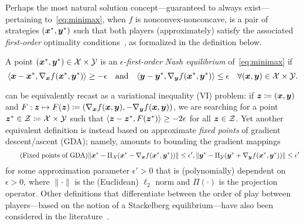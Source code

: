 Perhaps the most natural solution concept---guaranteed to always exist---pertaining to~\eqref{eq:minimax}, when $f$ is nonconvex-nonconcave, is a pair of strategies $({\bm{x}}^*, {\bm{y}}^*)$ such that both players (approximately) satisfy the associated \emph{first-order} optimality conditions~\citep{Tsaknakis21:Finding,Jordan23:First,Ostrovskii21:Efficient,Nouiehed19:Solving}, as formalized in the definition below.
\begin{definition}
    \label{def:FONE}
    A point $({\bm{x}}^*, {\bm{y}}^*) \in \mathcal{X} \times \mathcal{Y}$ is an \emph{$\epsilon$-first-order Nash equilibrium} of~\eqref{eq:minimax} if
    \begin{equation*}
        \langle {\bm{x}} - {\bm{x}}^*, \nabla_{{\bm{x}}} f({\bm{x}}^*, {\bm{y}}^*) \rangle \geq -\epsilon \quad \text{and} \quad \langle {\bm{y}} - {\bm{y}}^*, \nabla_{{\bm{y}}} f({\bm{x}}^*, {\bm{y}}^*) \rangle \leq  \epsilon \quad \forall ({\bm{x}}, {\bm{y}}) \in \mathcal{X} \times \mathcal{Y}.
    \end{equation*}
\end{definition}
 can be equivalently recast as a variational inequality (VI) problem: if ${\bm{z}} \coloneqq ({\bm{x}}, {\bm{y}})$ and $F : {\bm{z}} \mapsto F({\bm{z}}) \coloneqq (\nabla_{{\bm{x}}} f({\bm{x}}, {\bm{y}}), -\nabla_{{\bm{y}}} f({\bm{x}}, {\bm{y}}))$, we are searching for a point ${\bm{z}}^* \in \mathcal{Z} \coloneqq \mathcal{X} \times \mathcal{Y}$ such that $\langle {\bm{z}} - {\bm{z}}^*, F({\bm{z}}^*) \rangle \geq - 2 \epsilon$ for all ${\bm{z}} \in \mathcal{Z}$. Yet another equivalent definition is instead based on approximate \emph{fixed points} of gradient descent/ascent (GDA); namely,  amounts to bounding the gradient mappings
\begin{equation}
\label{eq:fpgda}
\tag{Fixed points of GDA} 
\| {\bm{x}}^* - \Pi_{\mathcal{X}} ( {\bm{x}}^* - \nabla_{{\bm{x}}} f({\bm{x}}^*, {\bm{y}}^*) ) \|\leq \epsilon', \| {\bm{y}}^* - \Pi_{\mathcal{Y}} ( {\bm{y}}^* + \nabla_{{\bm{y}}} f({\bm{x}}^*, {\bm{y}}^*) ) \|  \leq \epsilon'
\end{equation} 
for some approximation parameter $\epsilon' > 0$ that is (polynomially) dependent on $\epsilon > 0$, where $\|\cdot\|$ is the (Euclidean) $\ell_2$ norm and $\Pi(\cdot)$ is the projection operator. Other definitions that differentiate between the order of play between players---based on the notion of a Stackelberg equilibrium---have also been considered in the literature~\citep{Jin20:What}.

